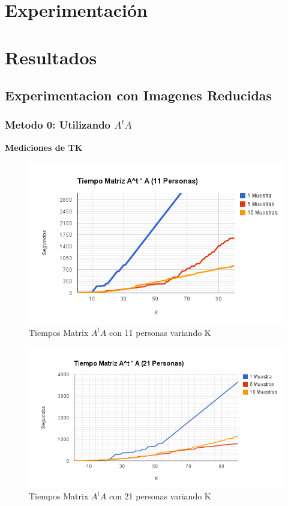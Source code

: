 \section{Experimentación}


\section{Resultados}
\subsection{Experimentacion con Imagenes Reducidas}
\subsubsection{Metodo 0: Utilizando $A^tA$}

\textbf{Mediciones de TK}
\begin{figure}[H]
\includegraphics[width=1\textwidth]{img/image1.png}
     \caption{Tiempos Matrix $A^tA$ con 11 personas variando K}
\end{figure}

\begin{figure}[H]
\includegraphics[width=1\textwidth]{img/image2.png}
     \caption{Tiempos Matrix $A^tA$ con 21 personas variando K}
\end{figure}

